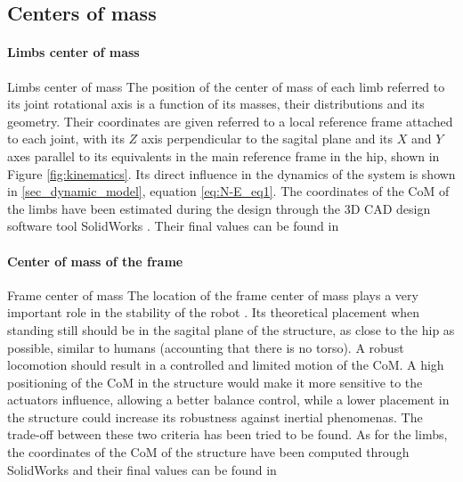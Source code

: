 \subsection{Centers of mass} %
\label{sub:centers_of_mass}

\paragraph{Limbs center of mass} %
\label{par:limbs_center_of_mass}
Limbs center of mass
The position of the center of mass of each limb referred to its joint rotational axis is a function of its masses, their distributions and its geometry.
Their coordinates are given referred to a local reference frame attached to each joint, with its $Z$ axis perpendicular to the sagital plane and its $X$ and $Y$ axes parallel to its equivalents in the main reference frame in the hip, shown in Figure \ref{fig:kinematics}.
Its direct influence in the dynamics of the system is shown in \ref{sec_dynamic_model}, equation \ref{eq:N-E_eq1}.
The coordinates of the CoM of the limbs have been estimated during the design through the 3D CAD design software tool SolidWorks \cite{solidworks}.
Their final values can be found in %

\paragraph{Center of mass of the frame} %
\label{par:center_of_mass_of_the_frame}
Frame center of mass
The location of the frame center of mass plays a very important role in the stability of the robot \cite{rojas}.
Its theoretical placement when standing still should be in the sagital plane of the structure, as close to the hip as possible, similar to humans (accounting that there is no torso).
A robust locomotion should result in a controlled and limited motion of the CoM. 
A high positioning of the CoM in the structure would make it more sensitive to the actuators influence, allowing a better balance control, while a lower placement in the structure could increase its robustness against inertial phenomenas.
The trade-off between these two criteria has been tried to be found.
As for the limbs, the coordinates of the CoM of the structure have been computed through SolidWorks and their final values can be found in %


